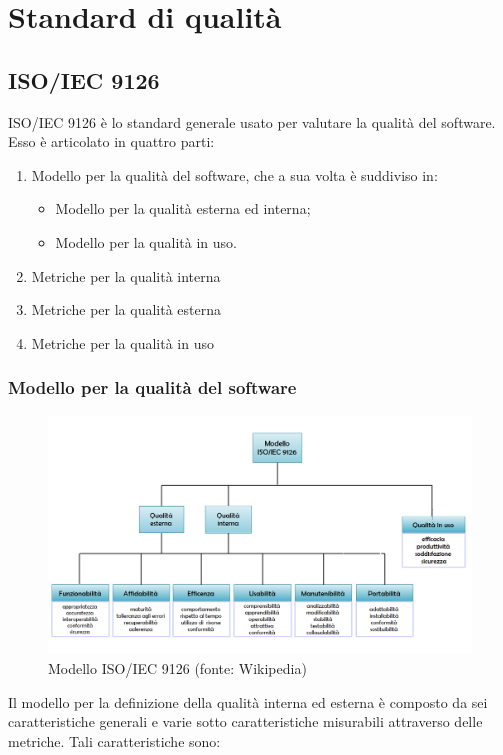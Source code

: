 \section{Standard di qualità}

\subsection{ISO/IEC 9126}
ISO/IEC 9126 è lo standard generale usato per valutare la qualità del software. Esso è articolato in quattro parti:
\begin{enumerate}
	\item{Modello per la qualità del software, che a sua volta è suddiviso in:}
	\begin{itemize}
		\item{Modello per la qualità esterna ed interna;}
		\item{Modello per la qualità in uso.}
	\end{itemize}
	\item{Metriche per la qualità interna}
	\item{Metriche per la qualità esterna}
	\item{Metriche per la qualità in uso}
\end{enumerate}

	\subsubsection{Modello per la qualità del software}
	\begin{figure}[H]
		\centering
		\includegraphics[scale=0.5]{./res/img/ISO_IEC_9126.png}
		\caption[Modello ISO/IEC 9126]{Modello ISO/IEC 9126 (fonte: Wikipedia)}
	\end{figure}
	
	Il modello per la definizione della qualità interna ed esterna è composto da sei caratteristiche generali e varie sotto caratteristiche misurabili attraverso delle metriche. Tali caratteristiche sono:
	
